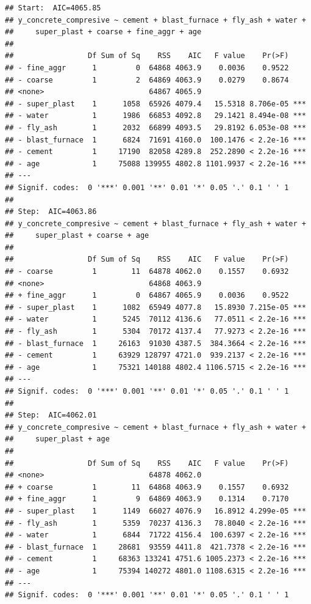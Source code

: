 \documentclass[
  12pt,
]{article}
\begin{document}
\begin{verbatim}
## Start:  AIC=4065.85
## y_concrete_compresive ~ cement + blast_furnace + fly_ash + water + 
##     super_plast + coarse + fine_aggr + age
## 
##                 Df Sum of Sq    RSS    AIC   F value    Pr(>F)    
## - fine_aggr      1         0  64868 4063.9    0.0036    0.9522    
## - coarse         1         2  64869 4063.9    0.0279    0.8674    
## <none>                        64867 4065.9                        
## - super_plast    1      1058  65926 4079.4   15.5318 8.706e-05 ***
## - water          1      1986  66853 4092.8   29.1421 8.494e-08 ***
## - fly_ash        1      2032  66899 4093.5   29.8192 6.053e-08 ***
## - blast_furnace  1      6824  71691 4160.0  100.1476 < 2.2e-16 ***
## - cement         1     17190  82058 4289.8  252.2890 < 2.2e-16 ***
## - age            1     75088 139955 4802.8 1101.9937 < 2.2e-16 ***
## ---
## Signif. codes:  0 '***' 0.001 '**' 0.01 '*' 0.05 '.' 0.1 ' ' 1
## 
## Step:  AIC=4063.86
## y_concrete_compresive ~ cement + blast_furnace + fly_ash + water + 
##     super_plast + coarse + age
## 
##                 Df Sum of Sq    RSS    AIC   F value    Pr(>F)    
## - coarse         1        11  64878 4062.0    0.1557    0.6932    
## <none>                        64868 4063.9                        
## + fine_aggr      1         0  64867 4065.9    0.0036    0.9522    
## - super_plast    1      1082  65949 4077.8   15.8930 7.215e-05 ***
## - water          1      5245  70112 4136.6   77.0511 < 2.2e-16 ***
## - fly_ash        1      5304  70172 4137.4   77.9273 < 2.2e-16 ***
## - blast_furnace  1     26163  91030 4387.5  384.3664 < 2.2e-16 ***
## - cement         1     63929 128797 4721.0  939.2137 < 2.2e-16 ***
## - age            1     75321 140188 4802.4 1106.5715 < 2.2e-16 ***
## ---
## Signif. codes:  0 '***' 0.001 '**' 0.01 '*' 0.05 '.' 0.1 ' ' 1
## 
## Step:  AIC=4062.01
## y_concrete_compresive ~ cement + blast_furnace + fly_ash + water + 
##     super_plast + age
## 
##                 Df Sum of Sq    RSS    AIC   F value    Pr(>F)    
## <none>                        64878 4062.0                        
## + coarse         1        11  64868 4063.9    0.1557    0.6932    
## + fine_aggr      1         9  64869 4063.9    0.1314    0.7170    
## - super_plast    1      1149  66027 4076.9   16.8912 4.299e-05 ***
## - fly_ash        1      5359  70237 4136.3   78.8040 < 2.2e-16 ***
## - water          1      6844  71722 4156.4  100.6397 < 2.2e-16 ***
## - blast_furnace  1     28681  93559 4411.8  421.7378 < 2.2e-16 ***
## - cement         1     68363 133241 4751.6 1005.2373 < 2.2e-16 ***
## - age            1     75394 140272 4801.0 1108.6315 < 2.2e-16 ***
## ---
## Signif. codes:  0 '***' 0.001 '**' 0.01 '*' 0.05 '.' 0.1 ' ' 1
\end{verbatim}
\end{document}
